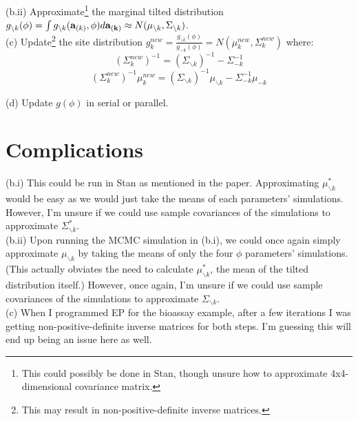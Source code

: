 \documentclass[12pt]{article}
\begin{document}
\indent (b.ii) Approximate\footnote{This could possibly be done in Stan, though unsure how to approximate 4x4-dimensional covariance matrix.} the marginal tilted distribution $g_{\backslash k} (\phi) = \int g_{\backslash k} ({\bf a}_{(k)},\phi) d{\bf a_{(k)}} \approx N(\mu_{\backslash k},\Sigma_{\backslash k})$.\\

\indent (c) Update\footnote{This may result in non-positive-definite inverse matrices.} the site distribution $g_k^{new} = \frac{g_{\backslash k}(\phi)}{g_{-k}(\phi)} = N(\mu_k^{new},\Sigma_k^{new})$ where:
$$ (\Sigma_k^{new})^{-1} = (\Sigma_{\backslash k})^{-1} - \Sigma_{-k}^{-1}$$
$$ (\Sigma_k^{new})^{-1} \mu_k^{new} = (\Sigma_{\backslash k})^{-1}\mu_{\backslash k} - \Sigma_{-k}^{-1}\mu_{-k}$$

\indent (d) Update $g(\phi)$ in serial or parallel.

\section*{Complications}
\noindent (b.i) This could be run in Stan as mentioned in the paper. Approximating $\mu_{\backslash k}^*$ would be easy as we would just take the means of each parameters' simulations. However, I'm unsure if we could use sample covariances of the simulations to approximate $\Sigma_{\backslash k}^*$. \\

\noindent (b.ii) Upon running the MCMC simulation in (b.i), we could once again simply approximate $\mu_{\backslash k}$ by taking the means of only the four $\phi$ parameters' simulations. (This actually obviates the need to calculate $\mu_{\backslash k}^*$, the mean of the tilted distribution itself.) However, once again, I'm unsure if we could use sample covariances of the simulations to approximate $\Sigma_{\backslash k}$.\\

\noindent (c) When I programmed EP for the bioassay example, after a few iterations I was getting non-positive-definite inverse matrices for both steps. I'm guessing this will end up being an issue here as well.

\end{document}
